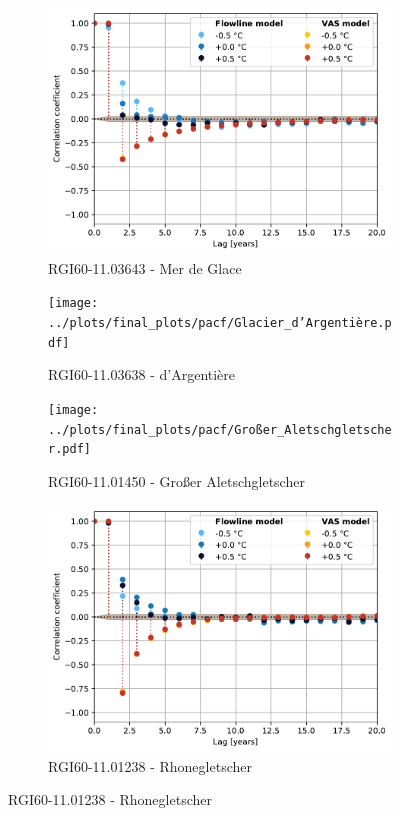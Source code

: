\begin{figure}[htp]
        \begin{subfigure}[b]{0.48\textwidth}
          \caption{RGI60-11.03643 - Mer de Glace}
          \label{fig:acf:mer_de_glace}
          \centering
          \includegraphics[width=\textwidth]{../plots/final_plots/pacf/Mer_de_Glace.pdf}
        \end{subfigure}
        \hfill
        \begin{subfigure}[b]{0.48\textwidth}
          \caption{RGI60-11.03638 - d'Argentière}
          \label{fig:acf:glacier_d_argentiere}
          \centering
          \texttt{[image: ../plots/final\_plots/pacf/Glacier\_d'Argentière.pdf]}
        \end{subfigure}

        \begin{subfigure}[b]{0.48\textwidth}
          \caption{RGI60-11.01450 - Großer Aletschgletscher}
          \label{fig:acf:großer_aletschgletscher}
          \centering
          \texttt{[image: ../plots/final\_plots/pacf/Großer\_Aletschgletscher.pdf]}
        \end{subfigure}
        \hfill
        \begin{subfigure}[b]{0.48\textwidth}
          \caption{RGI60-11.01238 - Rhonegletscher}
          \label{fig:acf:rhonegletscher}
          \centering
          \includegraphics[width=\textwidth]{../plots/final_plots/pacf/Rhonegletscher.pdf}
        \end{subfigure}


\end{figure}

